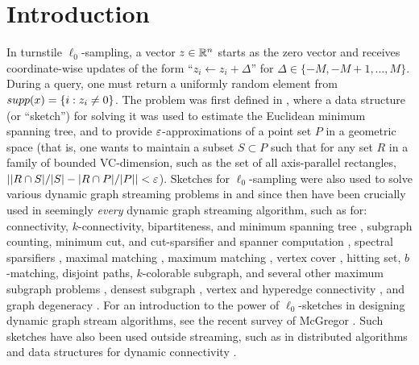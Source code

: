 \section{Introduction}\label{sec:intro}
In turnstile $\ell_0$-sampling, a vector $z\in\mathbb{R}^n$ starts as the zero vector and receives coordinate-wise updates of the form ``$z_i \leftarrow z_i + \Delta$'' for $\Delta\in\{-M,-M+1,\ldots,M\}$. During a query, one must return a uniformly random element from $\mathop{supp}(x) = \{i : z_i\neq 0\}$. The problem was first defined in \cite{FrahlingIS08}, where a data structure (or ``sketch'') for solving it was used to estimate the Euclidean minimum spanning tree, and to provide $\varepsilon$-approximations of a point set $P$ in a geometric space (that is, one wants to maintain a subset $S\subset P$ such that for any set $R$ in a family of bounded VC-dimension, such as the set of all axis-parallel rectangles, $||R\cap S|/|S| - |R\cap P|/|P|| < \varepsilon$). Sketches for $\ell_0$-sampling were also used to solve various dynamic graph streaming problems in \cite{AhnGM12a} and since then have been crucially used in seemingly {\em every} dynamic graph streaming algorithm, such as for: connectivity, $k$-connectivity, bipartiteness, and minimum spanning tree \cite{AhnGM12a}, subgraph counting, minimum cut, and cut-sparsifier and spanner computation \cite{AhnGM12b}, spectral sparsifiers \cite{AhnGM13}, maximal matching \cite{ChitnisCHM15}, maximum matching \cite{AhnGM12a,BuryS15,Konrad15,AssadiKLY16,ChitnisCEHMMV16,AssadiKL17}, vertex cover \cite{ChitnisCHM15,ChitnisCEHMMV16}, hitting set, $b$-matching, disjoint paths, $k$-colorable subgraph, and several other maximum subgraph problems \cite{ChitnisCEHMMV16}, densest subgraph \cite{BhattacharyaHNT15,McGregorTVV15,EsfandiariHW16}, vertex and hyperedge connectivity \cite{GuhaMT15}, and graph degeneracy \cite{FarachColtonT16}. For an introduction to the power of $\ell_0$-sketches in designing dynamic graph stream algorithms, see the recent survey of McGregor \cite[Section 3]{McGregor14}. Such sketches have also been used outside streaming, such as in distributed algorithms \cite{HegemanPPSS15,Pandurangan0S16} and data structures for dynamic connectivity \cite{KapronKM13,Wang15,GibbKKT15}.

